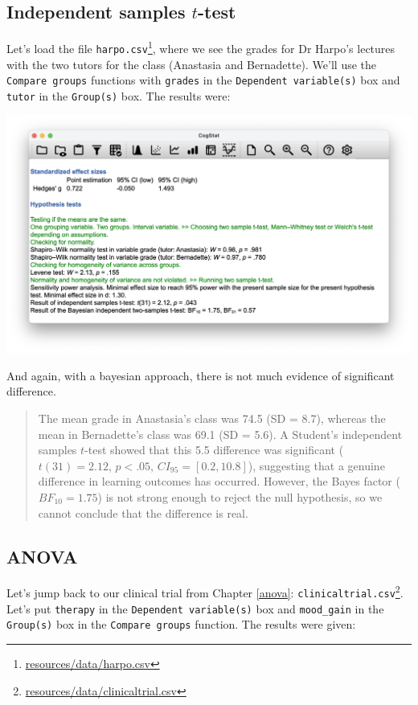 \documentclass[
  11pt,
  a4paper,
  twoside,symmetric,openright]{book}
\theoremstyle{break}
\theoremstyle{break}
\DeclareRobustCommand{\href}[2]{#2\footnote{\url{#1}}}
\begin{document}
\subsection{\texorpdfstring{Independent samples \(t\)-test}{Independent samples t-test}}\label{independent-samples-t-test}

Let's load the file \href{resources/data/harpo.csv}{\texttt{harpo.csv}}, where we see the grades for Dr Harpo's lectures with the two tutors for the class (Anastasia and Bernadette). We'll use the \texttt{Compare\ groups} functions with \texttt{grades} in the \texttt{Dependent\ variable(s)} box and \texttt{tutor} in the \texttt{Group(s)} box. The results were:

\begin{center}\includegraphics[width=0.6\linewidth]{resources/image/cogstatharpohypo} \end{center}

And again, with a bayesian approach, there is not much evidence of significant difference.

\begin{quote}
The mean grade in Anastasia's class was 74.5 (SD = 8.7), whereas the mean in Bernadette's class was 69.1 (SD = 5.6). A Student's independent samples \(t\)-test showed that this 5.5 difference was significant (\(t(31) = 2.12\), \(p<.05\), \(CI_{95} = [0.2, 10.8]\)), suggesting that a genuine difference in learning outcomes has occurred. However, the Bayes factor (\(BF_{10} = 1.75\)) is not strong enough to reject the null hypothesis, so we cannot conclude that the difference is real.
\end{quote}

\subsection{ANOVA}\label{anova-1}

Let's jump back to our clinical trial from Chapter \ref{anova}: \href{resources/data/clinicaltrial.csv}{\texttt{clinicaltrial.csv}}. Let's put \texttt{therapy} in the \texttt{Dependent\ variable(s)} box and \texttt{mood\_gain} in the \texttt{Group(s)} box in the \texttt{Compare\ groups} function. The results were given:
\end{document}
